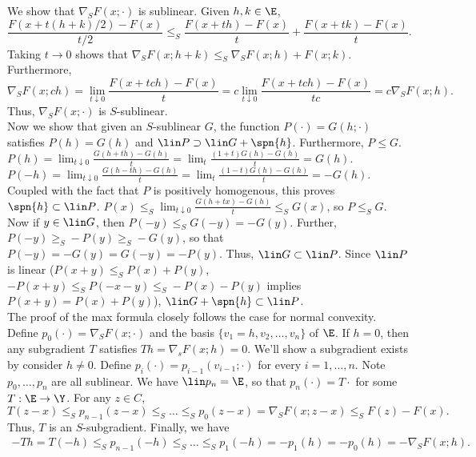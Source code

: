 \documentclass[../borwein-lewis_notes.tex]{subfiles}
\begin{document}
\begin{enumerate}[(a),resume]
{We show that $\nabla_S F(x;\cdot)$ is sublinear. Given $h,k\in\E$,
\begin{equation*}
\frac{F(x+t(h+k)/2)-F(x)}{t/2}\leq_S \frac{F(x+th)-F(x)}{t} + 
\frac{F(x+tk)-F(x)}{t}.
\end{equation*}
Taking $t\to0$ shows that $\nabla_S F(x;h+k)\leq_S \nabla_S F(x; h)
+ F(x; k)$. Furthermore, 
\begin{equation*}
\nabla_S F(x; ch) = \lim_{t\downarrow 0}\frac{F(x+tch)-F(x)}{t}
= c\lim_{t\downarrow0}\frac{F(x+tch)-F(x)}{tc} = c\nabla_S F(x;h).
\end{equation*}
Thus, $\nabla_S F(x;\cdot)$ is $S$-sublinear. \\
Now we show that given an $S$-sublinear $G$, the function $P(\cdot) = 
G(h;\cdot)$ satisfies $P(h) = G(h)$ and $\lin P \supset \lin G + 
\spn\{h\}$. Furthermore, $P\leq G$. \\
$P(h) = \lim_{t\downarrow0} \frac{G(h+th)-G(h)}{t} = \lim_t
\frac{(1+t)G(h) - G(h)}{t} = G(h)$. $P(-h) = \lim_{t\downarrow0}
\frac{G(h-th)-G(h)}{t} = \lim_t \frac{(1-t)G(h)-G(h)}{t} = -G(h)$. 
Coupled with the fact that $P$ is positively homogenous, this proves 
$\spn\{h\}\subset \lin P$. 
$P(x)\leq_S \lim_{t\downarrow0} \frac{G(h+tx)-G(h)}{t} \leq_S G(x)$,
so $P\leq_S G$.
Now if $y\in\lin G$, then 
$P(-y) \leq_S G(-y) = -G(y)$. Further, $P(-y) \geq_S -P(y)\geq_S -G(y)$,
so that $P(-y) = -G(y) = G(-y) = -P(y)$. Thus, 
$\lin G\subset\lin P$. Since $\lin P$ is linear ($P(x+y)\leq_S P(x)+P(y)$,
$-P(x+y)\leq_S P(-x-y) \leq_S -P(x)-P(y)$ implies $P(x+y)=P(x)+P(y)$), 
$\lin G+\spn\{h\}\subset \lin P$. \\
The proof of the max formula closely follows the case for normal 
convexity. Define $p_0(\cdot) = \nabla_S F(x;\cdot)$ and the basis 
$\{v_1=h, v_2,\ldots, v_n\}$ of $\E$. If $h=0$, then any subgradient $T$ 
satisfies $Th = \nabla_s F(x;h) = 0$. We'll show a subgradient exists 
by consider $h\neq 0$. Define $p_{i}(\cdot) = p_{i-1}(v_{i-1}; \cdot)$ for 
every $i=1,\ldots, n$. Note $p_0,\ldots, p_n$ are all sublinear. 
We have $\lin p_n = \E$, so that $p_n(\cdot) = T\cdot$ for some 
$T:\E\to\Y$. For any $z\in C$,
\begin{equation*}
T(z-x)\leq_S p_{n-1}(z-x) \leq_S \ldots \leq_S p_0(z-x) =
\nabla_S F(x;z-x) \leq_S F(z)-F(x).
\end{equation*}
Thus, $T$ is an $S$-subgradient. Finally, we have 
\begin{gather*}
-Th = T(-h) \leq_S p_{n-1}(-h) \leq_S \ldots \leq_S p_1(-h)
= -p_1(h) = -p_0(h) = -\nabla_S F(x;h).
\end{gather*}
}
\end{enumerate}
\end{document}
